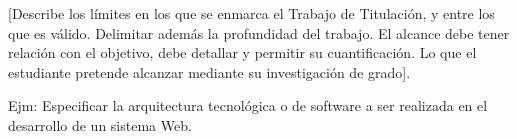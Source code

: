 [Describe los límites en los que se enmarca el Trabajo de Titulación, y entre los que es válido. Delimitar además la profundidad del trabajo. El alcance debe tener relación con el objetivo, debe detallar y permitir su cuantificación. Lo que el estudiante pretende alcanzar mediante su investigación de grado].
 
Ejm: Especificar la arquitectura tecnológica o de software a ser realizada en el desarrollo de un sistema Web.
